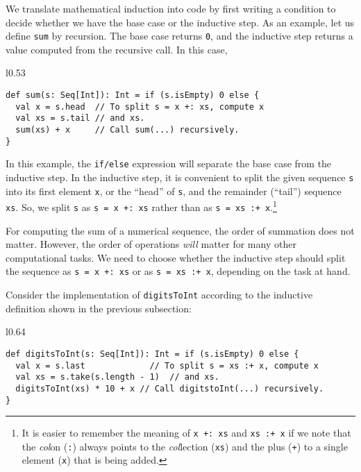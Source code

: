 We translate mathematical induction into code by first writing a condition
to decide whether we have the base case or the inductive step. As
an example, let us define \lstinline!sum! by recursion. The base
case returns \lstinline!0!, and the inductive step returns a value
computed from the recursive call. In this case, 

\begin{wrapfigure}{l}{0.53\columnwidth}%
\vspace{-0.85\baselineskip}
\begin{lstlisting}
def sum(s: Seq[Int]): Int = if (s.isEmpty) 0 else {
  val x = s.head  // To split s = x +: xs, compute x
  val xs = s.tail // and xs.
  sum(xs) + x     // Call sum(...) recursively.
}
\end{lstlisting}

\vspace{-1.5\baselineskip}
\end{wrapfigure}%

\noindent In this example, the \lstinline!if/else! expression will
separate the base case from the inductive step. In the inductive step,
it is convenient to split the given sequence \lstinline!s! into its
first element \lstinline!x!, or the \textsf{``}head\textsf{''} of \lstinline!s!,
and the remainder (\textsf{``}tail\textsf{''}) sequence \lstinline!xs!. So, we split
\lstinline!s! as \lstinline!s = x +: xs! rather than as \lstinline!s = xs :+ x!.\footnote{It is easier to remember the meaning of \lstinline!x +: xs! and \lstinline!xs :+ x!
if we note that the \emph{col}on (\lstinline!:!) always points to
the \emph{col}lection (\lstinline!xs!) and the plus (\lstinline!+!)
to a single element (\lstinline!x!) that is being added.}

For computing the sum of a numerical sequence, the order of summation
does not matter. However, the order of operations \emph{will} matter
for many other computational tasks. We need to choose whether the
inductive step should split the sequence as \lstinline!s = x +: xs!
or as \lstinline!s = xs :+ x!, depending on the task at hand.

Consider the implementation of \lstinline!digitsToInt! according
to the inductive definition shown in the previous subsection:

\begin{wrapfigure}{l}{0.64\columnwidth}%
\vspace{-0.85\baselineskip}
\begin{lstlisting}
def digitsToInt(s: Seq[Int]): Int = if (s.isEmpty) 0 else {
  val x = s.last             // To split s = xs :+ x, compute x
  val xs = s.take(s.length - 1)  // and xs.
  digitsToInt(xs) * 10 + x // Call digitstoInt(...) recursively.
}
\end{lstlisting}

\vspace{-1.5\baselineskip}
\end{wrapfigure}%

